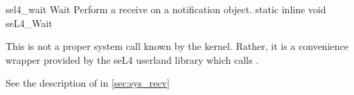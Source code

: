 %
%
%
%

\apidoc
{sel4_wait}
{Wait}
{Perform a receive on a notification object.}
{static inline void seL4\_Wait}
{
}
{\noret}
{This is not a proper system call
known by the kernel. Rather, it is a convenience
wrapper provided by the seL4 userland library which calls
.

See the description of  in \autoref{sec:sys_recv}
}
    
